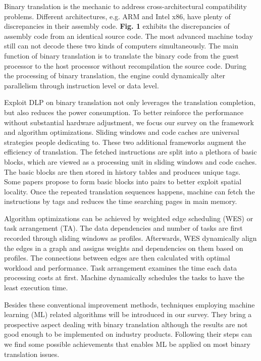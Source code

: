 \documentclass[sigconf, nonacm, natbib=false]{acmart}
\begin{document}
Binary translation is the mechanic to address cross-architectural compatibility problems. Different architectures, e.g. ARM and Intel x86, have plenty of discrepancies in their assembly code. {\bf Fig. 1} exhibits the discrepancies of assembly code from an identical source code. The most advanced machine today still can not decode these two kinds of computers simultaneously. The main function of binary translation is to translate the binary code from the guest processor to the host processor without recompilation the source code. During the processing of binary translation, the engine could dynamically alter parallelism through instruction level or data level.

Exploit DLP on binary translation not only leverages the translation completion, but also reduces the power consumption. To better reinforce the performance without substantial hardware adjustment, we focus our survey on the framework and algorithm optimizations. Sliding windows and code caches are universal strategies people dedicating to. These two additional frameworks augment the efficiency of translation. The fetched instructions are split into a plethora of basic blocks, which are viewed as a processing unit in sliding windows and code caches. The basic blocks are then stored in history tables and produces unique tags. Some papers propose to form basic blocks into pairs to better exploit spatial locality\parencite{neural_machine}. Once the repeated translation sequences happens, machine can fetch the instructions by tags and reduces the time searching pages in main memory. 

Algorithm optimizations can be achieved by weighted edge scheduling (WES)\parencite{weighted_edge_scheduling} or task arrangement (TA)\parencite{task_arrangement}. The data dependencies and number of tasks are first recorded through sliding windows as profiles. Afterwards, WES dynamically align the edges in a graph and assigns weights and dependencies on them based on profiles. The connections between edges are then calculated with optimal workload and performance. Task arrangement examines the time each data processing costs at first. Machine dynamically schedules the tasks to have the least execution time. 

Besides these conventional improvement methods, techniques employing machine learning (ML) related algorithms will be introduced in our survey. They bring a prospective aspect dealing with binary translation although the results are not good enough to be implemented on industry products. Following their steps can we find some possible achievements that enables ML be applied on most binary translation issues.
\end{document}
